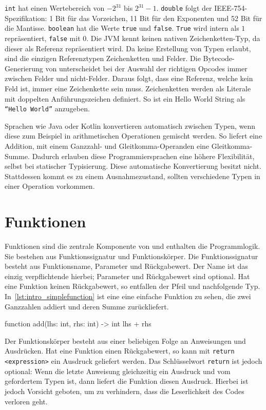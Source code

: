 \texttt{int} hat einen Wertebereich von $-2^{31}$ bis $2^{31} - 1$. \texttt{double} folgt der IEEE-754-Spezifikation: 1 Bit für das Vorzeichen, 11 Bit für den Exponenten und 52 Bit für die Mantisse. \texttt{boolean} hat die Werte \texttt{true} und \texttt{false}. \texttt{True} wird intern als $1$ repräsentiert, \texttt{false} mit 0. Die JVM kennt keinen nativen Zeichenketten-Typ, da dieser als Referenz repräsentiert wird. Da \toya keine Erstellung von Typen erlaubt, sind die einzigen Referenztypen Zeichenketten und Felder. Die Bytecode-Generierung von \toya unterscheidet bei der Auswahl der richtigen Opcodes immer zwischen Felder und nicht-Felder. Daraus folgt, dass eine Referenz, welche kein Feld ist, immer eine Zeichenkette sein muss. Zeichenketten werden als Literale mit doppelten Anführungszeichen definiert. So ist ein Hello World String als \texttt{``Hello World''} anzugeben.

Sprachen wie Java oder Kotlin konvertieren automatisch zwischen Typen, wenn diese zum Beispiel in arithmetischen Operationen gemischt werden. So liefert eine Addition, mit einem Ganzzahl- und Gleitkomma-Operanden eine Gleitkomma-Summe. Dadurch erlauben diese Programmiersprachen eine höhere Flexibilität, selbst bei statischer Typisierung. Diese automatische Konvertierung besitzt \toya nicht. Stattdessen kommt es zu einem Ausnahmezustand, sollten verschiedene Typen in einer Operation vorkommen.

\section{Funktionen}

Funktionen sind die zentrale Komponente von \toya und enthalten die Programmlogik. Sie bestehen aus Funktionssignatur und Funktionskörper. Die Funktionssignatur besteht aus Funktionsname, Parameter und Rückgabewert. Der Name ist das einzig verpflichtende hierbei; Parameter und Rückgabewert sind optional. Hat eine Funktion keinen Rückgabewert, so entfallen der Pfeil und nachfolgende Typ. In~\autoref{lst:intro_simplefunction} ist eine eine einfache Funktion zu sehen, die zwei Ganzzahlen addiert und deren Summe zurückliefert.

\begin{ToyaCode}[numbers=none, caption={Eine typische Funktion unter toya.}, label=lst:intro_simplefunction]
function add(lhs: int, rhs: int) -> int {
    lhs + rhs
}
\end{ToyaCode}

Der Funktionskörper besteht aus einer beliebigen Folge an Anweisungen und Ausdrücken. Hat eine Funktion einen Rückgabewert, so kann mit \texttt{return <expression>} ein Ausdruck geliefert werden. Das Schlüsselwort \texttt{return} ist jedoch optional: Wenn die letzte Anweisung gleichzeitig ein Ausdruck und vom gefordertem Typen ist, dann liefert die Funktion diesen Ausdruck. Hierbei ist jedoch Vorsicht geboten, um zu verhindern, dass die Leserlichkeit des Codes verloren geht.

